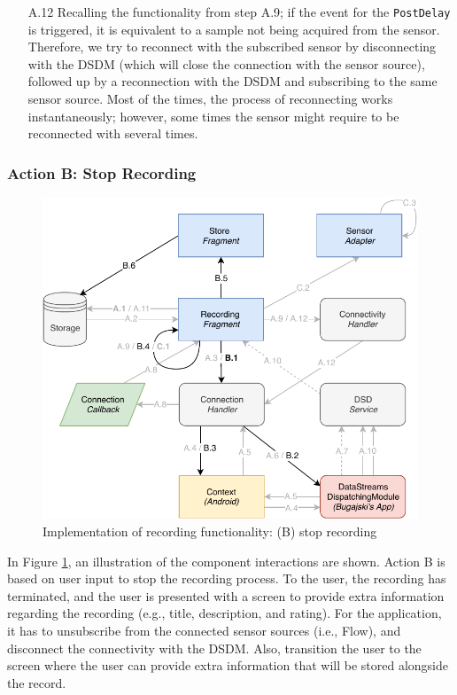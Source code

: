 \begin{itemize}
    \item[A.12] Recalling the functionality from step A.9; if the event for the \verb|PostDelay| is triggered, it is equivalent to a sample not being acquired from the sensor. Therefore, we try to reconnect with the subscribed sensor by disconnecting with the DSDM (which will close the connection with the sensor source), followed up by a reconnection with the DSDM and subscribing to the same sensor source. Most of the times, the process of reconnecting works instantaneously; however, some times the sensor might require to be reconnected with several times. 
\end{itemize}

\subsubsection{Action B: Stop Recording}
\begin{figure}
    \centering
    \includegraphics[scale=0.7]{images/Recording_ImpB.pdf}
    \caption{Implementation of recording functionality: (B) stop recording}
    \label{fig:impl_recordingB}
\end{figure}

In Figure \ref{fig:impl_recordingB}, an illustration of the component interactions are shown. Action B is based on user input to stop the recording process. To the user, the recording has terminated, and the user is presented with a screen to provide extra information regarding the recording (e.g., title, description, and rating). For the application, it has to unsubscribe from the connected sensor sources (i.e., Flow), and disconnect the connectivity with the DSDM. Also, transition the user to the screen where the user can provide extra information that will be stored alongside the record.

